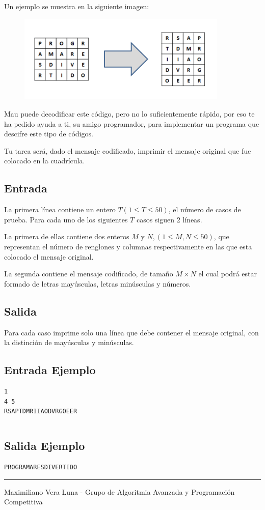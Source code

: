\documentclass[letter,10pt]{article}
\newcommand{\lyxaddress}[1]{
\par {\raggedright #1
\vspace{1.4em}
\noindent\par}
}
\begin{document}
Un ejemplo se muestra en la siguiente imagen:

\begin{figure}[htb]
\centering
\includegraphics[width=10cm]{cr3.png}
\end{figure}

Mau puede decodificar este código, pero no lo suficientemente rápido, por eso te ha pedido ayuda a ti, su amigo programador, para implementar un programa que descifre este tipo de códigos.

Tu tarea será, dado el mensaje codificado, imprimir el mensaje original que fue colocado en la cuadrícula.
$$$$
\subsection*{Entrada}

La primera línea contiene un entero $T(1\leq T\leq 50)$, el número de casos de prueba.
Para cada uno de los siguientes $T$ casos siguen 2 líneas.

La primera  de ellas contiene dos enteros $M$ y $N,(1\leq M,N\leq 50)$, que representan el número de renglones y columnas respectivamente en las que esta colocado el mensaje original.

La segunda contiene el mensaje codificado, de tamaño $M\times N$ el cual podrá estar formado de letras mayúsculas, letras minúsculas y números.  
$$$$
\subsection*{Salida}

Para cada caso imprime solo una línea que debe contener el mensaje original, con la distinción de mayúsculas y minúsculas.
\newpage
$$$$
$$$$
$$$$


\subsection*{Entrada Ejemplo}
\begin{verbatim}
1
4 5
RSAPTDMRIIAODVRGOEER
\end{verbatim}
$$$$
\subsection*{Salida Ejemplo}
\begin{verbatim}
PROGRAMARESDIVERTIDO
\end{verbatim}

\noindent \rule[0.5ex]{1\columnwidth}{1pt}


\lyxaddress{Maximiliano Vera Luna - Grupo de Algoritmia Avanzada y Programación Competitiva}
\end{document}
